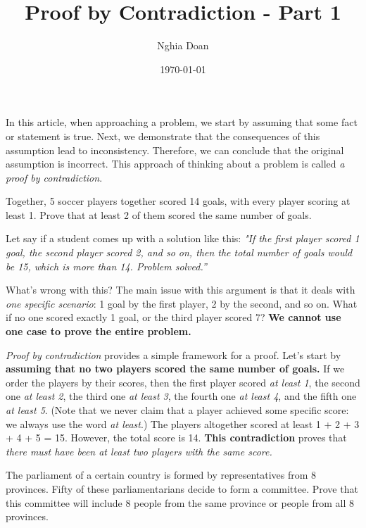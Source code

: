 \documentclass{article}
\title{Proof by Contradiction - Part 1}
\author{Nghia Doan}
\date{\today}
\begin{document}
\maketitle

In this article, when approaching a problem, we start by assuming that some fact or statement is true.
Next, we demonstrate that the consequences of this assumption lead to inconsistency.
Therefore, we can conclude that the original assumption is incorrect.
This approach of thinking about a problem is called \textit{a proof by contradiction}.

\begin{example*}[Example 1]
    Together, 5 soccer players together scored 14 goals, with every player scoring at least 1.
    Prove that at least 2 of them scored the same number of goals.
\end{example*}

\begin{remark*}
    Let say if a student comes up with a solution like this:
    \textit{"If the first player scored 1 goal, the second player scored 2, and so on,
    then the total number of goals would be 15, which is more than 14. Problem solved.”}

    What's wrong with this? The main issue with this argument is that
    it deals with \textit{one specific scenario}: 1 goal by the first player, 2 by the second, and so on.
    What if no one scored exactly 1 goal, or the third player scored 7?
    \textbf{We cannot use one case to prove the entire problem.}
\end{remark*}

\begin{soln}
    \textit{Proof by contradiction} provides a simple framework for a proof.
    Let's start by \textbf{assuming that no two players scored the same number of goals.}
    If we order the players by their scores, then the first player scored \textit{at least 1},
    the second one \textit{at least 2}, the third one \textit{at least 3}, the fourth one \textit{at least 4},
    and the fifth one \textit{at least 5}.
    (Note that we never claim that a player achieved some specific score: we always use the word \textit{at least}.)
    The players altogether scored at least 1 + 2 + 3 + 4 + 5 = 15. However, the total score is 14.
    \textbf{This contradiction} proves that \textit{there must have been at least two players with the same score.}
\end{soln}

\begin{example*}[Example 2]
    The parliament of a certain country is formed by representatives from 8 provinces.
    Fifty of these parliamentarians decide to form a committee.
    Prove that this committee will include 8 people from the same province or people from all 8 provinces.
\end{example*}
\end{document}
